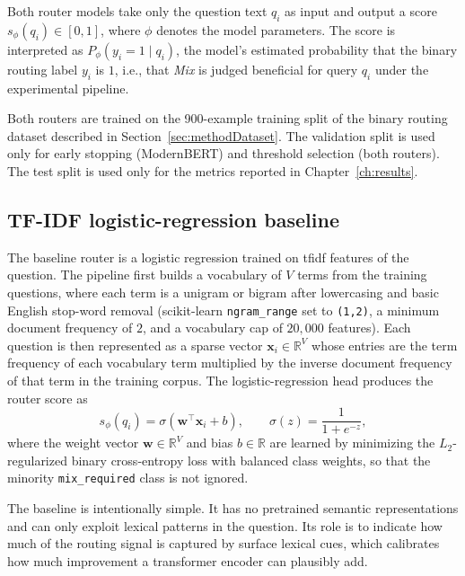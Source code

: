 \documentclass[english, bibtex]{kththesis}               %
\numberwithin{listing}{chapter}
\begin{document}
Both router models take only the question text $q_i$ as input and output a score \(s_\phi(q_i) \in [0,1]\), where $\phi$ denotes the model parameters. The score is interpreted as $P_\phi(y_i = 1 \mid q_i)$, the model's estimated probability that the binary routing label $y_i$ is $1$, i.e., that \emph{Mix} is judged beneficial for query $q_i$ under the experimental pipeline.

Both routers are trained on the 900-example training split of the binary routing dataset described in Section~\ref{sec:methodDataset}. The validation split is used only for early stopping (ModernBERT) and threshold selection (both routers). The test split is used only for the metrics reported in Chapter~\ref{ch:results}.

\subsection{TF-IDF logistic-regression baseline}
\label{sec:methodTfidf}

The baseline router is a logistic regression trained on \gls{tfidf} features of the question. The pipeline first builds a vocabulary of \(V\) terms from the training questions, where each term is a unigram or bigram after lowercasing and basic English stop-word removal (scikit-learn \texttt{ngram\_range} set to \texttt{(1,2)}, a minimum document frequency of $2$, and a vocabulary cap of $20{,}000$ features). Each question is then represented as a sparse vector \(\mathbf{x}_i \in \mathbb{R}^{V}\) whose entries are the term frequency of each vocabulary term multiplied by the inverse document frequency of that term in the training corpus. The logistic-regression head produces the router score as
\begin{equation}
\label{eq:tfidfScore}
s_\phi(q_i) = \sigma(\mathbf{w}^\top \mathbf{x}_i + b),
\qquad
\sigma(z) = \frac{1}{1 + e^{-z}},
\end{equation}
where the weight vector \(\mathbf{w} \in \mathbb{R}^{V}\) and bias \(b \in \mathbb{R}\) are learned by minimizing the $L_2$-regularized binary cross-entropy loss with balanced class weights, so that the minority \texttt{mix\_required} class is not ignored.

The baseline is intentionally simple. It has no pretrained semantic representations and can only exploit lexical patterns in the question. Its role is to indicate how much of the routing signal is captured by surface lexical cues, which calibrates how much improvement a transformer encoder can plausibly add.
\end{document}
